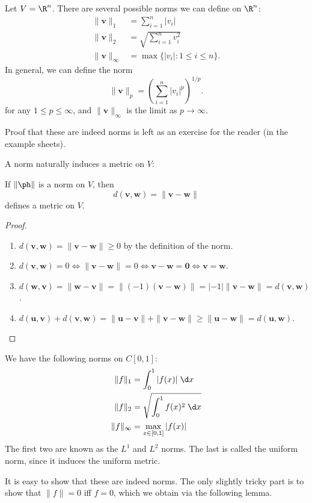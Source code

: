 \documentclass[a4paper]{article}
\begin{document}
\begin{eg}
  Let $V = \R^n$. There are several possible norms we can define on $\R^n$:
  \begin{align*}
    \|\mathbf{v}\|_1 &= \sum_{i = 1}^n |v_i|\\
    \|\mathbf{v}\|_2 &= \sqrt{\sum_{i = 1}^n v_i^2}\\
    \|\mathbf{v}\|_\infty &= \max \{|v_i|: 1 \leq i \leq n\}.
  \end{align*}
  In general, we can define the norm
  \[
    \|\mathbf{v}\|_p = \left(\sum_{i = 1}^n |v_i|^p\right)^{1/p}.
  \]
  for any $1 \leq p \leq \infty$, and $\|\mathbf{v}\|_\infty$ is the limit as $p\to \infty$.

  Proof that these are indeed norms is left as an exercise for the reader (in the example sheets).
\end{eg}

A norm naturally induces a metric on $V$:
\begin{lemma}
  If $\|\ph\|$ is a norm on $V$, then
  \[
    d(\mathbf{v}, \mathbf{w}) = \|\mathbf{v} - \mathbf{w}\|
  \]
  defines a metric on $V$.
\end{lemma}

\begin{proof}\leavevmode
  \begin{enumerate}
    \item $d(\mathbf{v}, \mathbf{w}) = \|\mathbf{v} - \mathbf{w}\| \geq 0$ by the definition of the norm.
    \item $d(\mathbf{v}, \mathbf{w}) = 0 \Leftrightarrow \|\mathbf{v} - \mathbf{w}\| = 0 \Leftrightarrow \mathbf{v} - \mathbf{w} = \mathbf{0} \Leftrightarrow \mathbf{v} = \mathbf{w}$.
    \item $d(\mathbf{w}, \mathbf{v}) = \|\mathbf{w} - \mathbf{v}\| = \|(-1)(\mathbf{v} - \mathbf{w})\| = |-1| \|\mathbf{v} - \mathbf{w}\| = d(\mathbf{v}, \mathbf{w})$.
    \item $d(\mathbf{u}, \mathbf{v}) + d(\mathbf{v}, \mathbf{w}) = \|\mathbf{u} - \mathbf{v}\| + \|\mathbf{v} - \mathbf{w}\| \geq \|\mathbf{u} - \mathbf{w}\| = d(\mathbf{u}, \mathbf{w})$.\qedhere
  \end{enumerate}
\end{proof}

\begin{eg}
  We have the following norms on $C[0, 1]$:
  \begin{align*}
    \|f\|_1 &= \int_0^1 |f(x)|\;\d x\\
    \|f\|_2 &= \sqrt{\int_0^1 f(x)^2 \;\d x}\\
    \|f\|_{\infty} &= \max_{x \in [0, 1]}|f(x)|
  \end{align*}
  The first two are known as the $L^1$ and $L^2$ norms. The last is called the uniform norm, since it induces the uniform metric.
\end{eg}
It is easy to show that these are indeed norms. The only slightly tricky part is to show that $\|f\| = 0$ iff $f = 0$, which we obtain via the following lemma.
\end{document}
